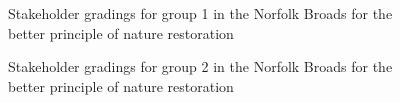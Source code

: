 \documentclass[
  12pt,
  letterpaper,
  DIV=11,
  numbers=noendperiod]{scrartcl}
\begin{document}
\begin{figure}[H]
{}

\caption{\label{fig-BroadsBetterG1}Stakeholder gradings for group 1 in
the Norfolk Broads for the better principle of nature restoration}

\end{figure}%

\begin{figure}[H]


\caption{\label{fig-BroadsBetterG2}Stakeholder gradings for group 2 in
the Norfolk Broads for the better principle of nature restoration}

\end{figure}%
\end{document}

